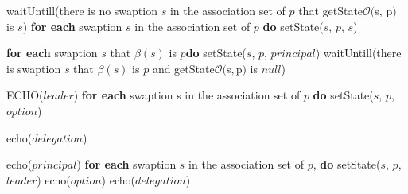 \begin{enumerate}
\begin{algorithm}[H]
\begin{algorithmic}[1]
    \EndWhile
\EndFunction

    \State waitUntill(there is no swaption $s$ in the association set of $p$ that getState$\mathcal{O}($s, p$)$ is $s$)
    \State \textbf{for each} swaption $s$ in the association set of $p$ \textbf{do} \tab setState($s$, $p$, $s$)
\EndFunction
\\
        
        
        \State \textbf{for each} swaption $s$ that $\beta(s)$ is $p$\textbf{do}  \tab setState($s$, $p$, $principal$)
        \State waitUntill(there is swaption $s$ that $\beta(s)$ is $p$ and getState$\mathcal{O}($s$, $p$)$ is $null$)
        
        \State ECHO($leader$)
        \State \textbf{for each} swaption s in the association set of $p$ \textbf{do} \tab setState($s$, $p$, $option$)
               
    
            
    \end{algorithmic}
    \end{algorithm}

\begin{algorithm} [H]                    
\begin{algorithmic} [1]                   %
\State echo($delegation$)
        
        echo($principal$)        
        \State \textbf{for each} swaption $s$ in the association set of $p$, \textbf{do} setState($s$, $p$, $leader$) 
        \State echo($option$)
        \State echo($delegation$)
        

\end{algorithmic}
\end{algorithm}
\end{enumerate}
